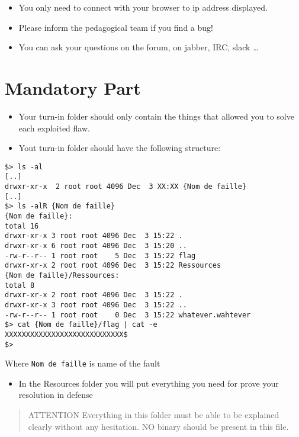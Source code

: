 \begin{itemize}
\tightlist{}
\item
  You only need to connect with your browser to ip address displayed.
\item
  Please inform the pedagogical team if you find a bug!
\item
  You can ask your questions on the forum, on jabber, IRC, slack
  \ldots{}
\end{itemize}

\section{Mandatory Part}

\begin{itemize}
\tightlist{}
\item
  Your turn-in folder should only contain the things that allowed you to
  solve each exploited flaw.
\item
  Yout turn-in folder should have the following structure:
\end{itemize}

\begin{verbatim}
$> ls -al
[..]
drwxr-xr-x  2 root root 4096 Dec  3 XX:XX {Nom de faille}
[..]
$> ls -alR {Nom de faille}
{Nom de faille}:
total 16
drwxr-xr-x 3 root root 4096 Dec  3 15:22 .
drwxr-xr-x 6 root root 4096 Dec  3 15:20 ..
-rw-r--r-- 1 root root    5 Dec  3 15:22 flag
drwxr-xr-x 2 root root 4096 Dec  3 15:22 Ressources
{Nom de faille}/Ressources:
total 8
drwxr-xr-x 2 root root 4096 Dec  3 15:22 .
drwxr-xr-x 3 root root 4096 Dec  3 15:22 ..
-rw-r--r-- 1 root root    0 Dec  3 15:22 whatever.wahtever
$> cat {Nom de faille}/flag | cat -e
XXXXXXXXXXXXXXXXXXXXXXXXXXXX$
$>
\end{verbatim}

Where \texttt{Nom\ de\ faille} is name of the fault

\begin{itemize}
\tightlist{}
\item
  In the Resources folder you will put everything you need for prove
  your resolution in defense
\end{itemize}

\begin{quote}
ATTENTION\: Everything in this folder must be able to be explained
clearly without any hesitation. NO binary should be present in this
file.
\end{quote}

